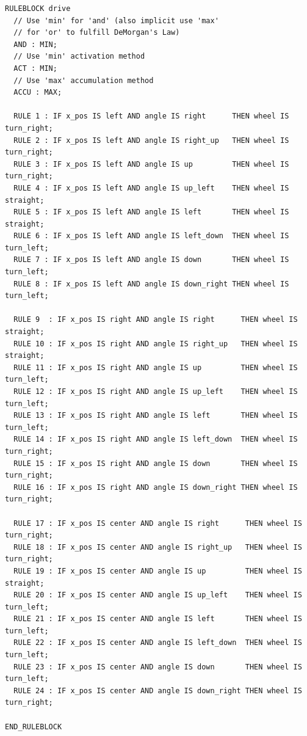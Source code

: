 \documentclass[12pt, a4paper]{article}
\begin{document}
\begin{verbatim}
RULEBLOCK drive
  // Use 'min' for 'and' (also implicit use 'max'
  // for 'or' to fulfill DeMorgan's Law)
  AND : MIN;
  // Use 'min' activation method
  ACT : MIN;
  // Use 'max' accumulation method
  ACCU : MAX;

  RULE 1 : IF x_pos IS left AND angle IS right      THEN wheel IS turn_right;
  RULE 2 : IF x_pos IS left AND angle IS right_up   THEN wheel IS turn_right;
  RULE 3 : IF x_pos IS left AND angle IS up         THEN wheel IS turn_right;
  RULE 4 : IF x_pos IS left AND angle IS up_left    THEN wheel IS straight;
  RULE 5 : IF x_pos IS left AND angle IS left       THEN wheel IS straight;
  RULE 6 : IF x_pos IS left AND angle IS left_down  THEN wheel IS turn_left;
  RULE 7 : IF x_pos IS left AND angle IS down       THEN wheel IS turn_left;
  RULE 8 : IF x_pos IS left AND angle IS down_right THEN wheel IS turn_left;

  RULE 9  : IF x_pos IS right AND angle IS right      THEN wheel IS straight;
  RULE 10 : IF x_pos IS right AND angle IS right_up   THEN wheel IS straight;
  RULE 11 : IF x_pos IS right AND angle IS up         THEN wheel IS turn_left;
  RULE 12 : IF x_pos IS right AND angle IS up_left    THEN wheel IS turn_left;
  RULE 13 : IF x_pos IS right AND angle IS left       THEN wheel IS turn_left;
  RULE 14 : IF x_pos IS right AND angle IS left_down  THEN wheel IS turn_right;
  RULE 15 : IF x_pos IS right AND angle IS down       THEN wheel IS turn_right;
  RULE 16 : IF x_pos IS right AND angle IS down_right THEN wheel IS turn_right;

  RULE 17 : IF x_pos IS center AND angle IS right      THEN wheel IS turn_right;
  RULE 18 : IF x_pos IS center AND angle IS right_up   THEN wheel IS turn_right;
  RULE 19 : IF x_pos IS center AND angle IS up         THEN wheel IS straight;
  RULE 20 : IF x_pos IS center AND angle IS up_left    THEN wheel IS turn_left;
  RULE 21 : IF x_pos IS center AND angle IS left       THEN wheel IS turn_left;
  RULE 22 : IF x_pos IS center AND angle IS left_down  THEN wheel IS turn_left;
  RULE 23 : IF x_pos IS center AND angle IS down       THEN wheel IS turn_left;
  RULE 24 : IF x_pos IS center AND angle IS down_right THEN wheel IS turn_right;

END_RULEBLOCK
\end{verbatim}
\end{document}
